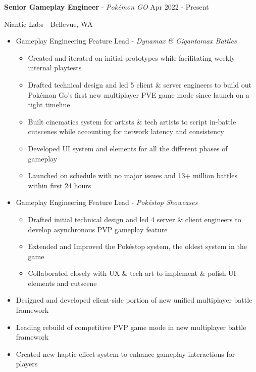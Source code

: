\documentclass[resmargin,10pt]{res} %
\begin{document}
\begin{resume}
    {\bf Senior Gameplay Engineer} - \textit{Pokémon GO} \hfill Apr 2022 - Present
    \begin{ncolumn}{1}
        {Niantic Labs} - Bellevue, WA \\
    \end{ncolumn}
    \begin{itemize}
        \setlength\itemsep{-0.1em}
        \item Gameplay Engineering Feature Lead - \textit{Dynamax \& Gigantamax Battles}
        \begin{itemize}[leftmargin=0.5em,topsep=0.0em]
            \setlength\itemsep{-0.0em}
            \item Created and iterated on initial prototypes while facilitating weekly internal playtests
            \item Drafted technical design and led 5 client \& server engineers to build out Pokémon Go's first new multiplayer PVE game mode since launch on a tight timeline
            \item Built cinematics system for artists \& tech artists to script in-battle cutscenes while accounting for network latency and consistency
            \item Developed UI system and elements for all the different phases of gameplay
            \item Launched on schedule with no major issues and 13+ million battles within first 24 hours
        \end{itemize}
        \item Gameplay Engineering Feature Lead - \textit{Pokéstop Showcases}
        \begin{itemize}[leftmargin=0.5em,topsep=0.0em]
            \setlength\itemsep{-0.0em}
            \item Drafted initial technical design and led 4 server \& client engineers to develop asynchronous PVP gameplay feature
            \item Extended and Improved the Pokéstop system, the oldest system in the game
            \item Collaborated closely with UX \& tech art to implement \& polish UI elements and cutscene
        \end{itemize}
        \item Designed and developed client-side portion of new unified multiplayer battle framework
        \item Leading rebuild of competitive PVP game mode in new multiplayer battle framework
        \item Created new haptic effect system to enhance gameplay interactions for players

\end{itemize}
\end{resume}
\end{document}
